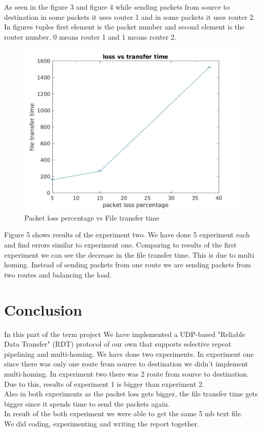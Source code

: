 \documentclass[conference]{IEEEtran}
\begin{document}
 \FloatBarrier
  As seen in the figure 3 and figure 4 while sending packets from source to destination in some packets it uses router 1 and in some packets it uses router 2. In figures tuples first element is the packet number and second element is the router number. 0 means router 1 and 1 means router 2.
\begin{figure}[h]
\includegraphics[scale = 0.32]{netpar2ex21.jpg}
\caption{Packet loss percentage vs File transfer time}
\end{figure}
 \FloatBarrier
 Figure 5 shows results of the experiment two. We have done 5 experiment each and find errors similar to experiment one. Comparing to results of the first experiment we can see the decrease in the file transfer time. This is due to multi homing. Instead of sending packets from one route we are sending packets from two routes and balancing the load.
\section{Conclusion}
In this part of the term project We have implemented a UDP-based "Reliable Data Transfer" (RDT) protocol of our own that supports selective repeat pipelining and multi-homing. We have done two experiments. In experiment one since there was only one route from source to destination we didn't implement multi-homing. In experiment two there was 2 route from source to destination. Due to this, results of experiment 1 is bigger than experiment 2. \\
Also in both experiments as the packet loss gets bigger, the file transfer time gets bigger since it spends time to send the packets again. \\
In result of the both experiment we were able to get the same 5 mb text file. \\
We did coding, experimenting and writing the report together.
\end{document}
